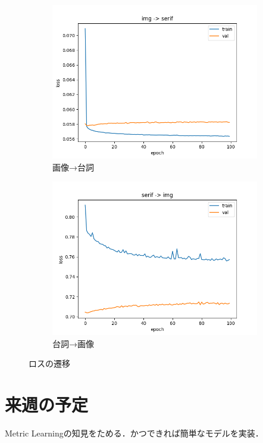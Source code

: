 \documentclass[onecolumn]{ujarticle}   %
\begin{document}
	\begin{figure}[h]
		\centering
		\begin{subfigure}{0.8\columnwidth}
			\centering
			\includegraphics[width=1.0\columnwidth]{data/MLP_imgserif_loss.png}
				\caption{画像→台詞}
		\end{subfigure}
		\begin{subfigure}{0.8\columnwidth}
			\centering
			\includegraphics[width=1.0\columnwidth]{data/MLP_serifimg_loss.png}
				\caption{台詞→画像}
		\end{subfigure}
		\caption{ロスの遷移}
		\label{fig:loss}
	\end{figure}

	\section{来週の予定}\noindent
	Metric Learningの知見をためる．かつできれば簡単なモデルを実装．
\end{document}
